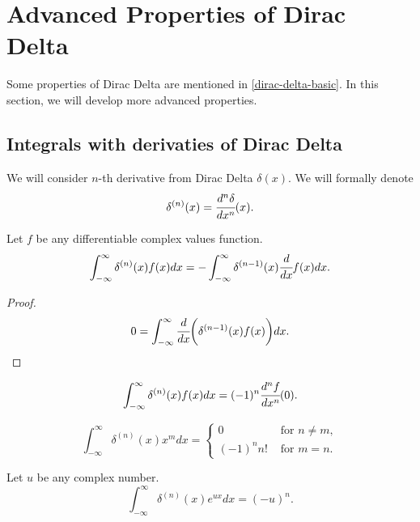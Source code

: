 \documentclass[main.tex]{subfiles}
\begin{document}
\section{Advanced Properties of Dirac Delta}
Some properties of Dirac Delta are mentioned in \ref{dirac-delta-basic}. In this section, we will develop more advanced properties.

\subsection{Integrals with derivaties of Dirac Delta}
We will consider $n$-th derivative from Dirac Delta $\delta(x)$. We will formally denote
\begin{equation}
\delta^{(n)}(x) = \cfrac{d^n \delta}{dx^n}(x).
\end{equation} 

\begin{lemma} Let $f$ be any differentiable complex values function. 
\begin{equation}
\int_{-\infty}^{\infty} \delta^{(n)}(x) f(x)dx = - \int_{-\infty}^{\infty} \delta^{(n - 1)}(x) \cfrac{d}{dx}f(x)dx. 
\end{equation}
\end{lemma}
\begin{proof}
\begin{equation}
0 = \int_{-\infty}^{\infty} \cfrac{d}{dx}\bigg( \delta^{(n - 1)}(x) f(x)\bigg) dx.
\end{equation}
\end{proof}

\begin{corollary}
\begin{equation}
\int_{-\infty}^{\infty} \delta^{(n)}(x) f(x)dx = (-1)^n \cfrac{d^n f}{dx^n}(0).
\end{equation}
\end{corollary}

\begin{corollary}
\label{delta-derivative-reduction}
\begin{equation}
\int_{-\infty}^{\infty} \delta^{(n)}(x) x^m dx = 
\begin{cases}
0 &\text{ for } n\not=m,\\
(-1)^n n! &\text{ for } m = n.
\end{cases}
\end{equation}
\end{corollary}

\begin{corollary} Let $u$ be any complex number.
\begin{equation}
\int_{-\infty}^\infty \delta^{(n)}(x) e^{ux} dx = (-u)^n.
\end{equation}
\end{corollary}
\end{document}
